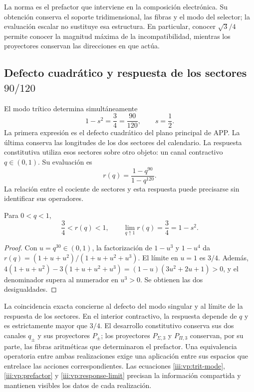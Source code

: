 La norma es el prefactor que interviene en la composición electrónica.
Su obtención conserva el soporte tridimensional, las fibras y el modo
del selector; la evaluación escalar no sustituye esa estructura. En
particular, conocer $\sqrt3/4$ permite conocer la magnitud máxima de
la incompatibilidad, mientras los proyectores conservan las direcciones
en que actúa.

\subsection{Defecto cuadrático y respuesta de los sectores \(90/120\)}

El modo trítico determina simultáneamente
\begin{equation}
 1-s^2=\frac34=\frac{90}{120},\qquad s=\frac12.
 \label{iii:vp:defect-ratio}
\end{equation}
La primera expresión es el defecto cuadrático del plano principal de APP.
La última conserva las longitudes de los dos sectores del calendario.
La respuesta constitutiva utiliza esos sectores sobre otro objeto: un
canal contractivo $q\in(0,1)$. Su evaluación es
\[
 r(q)=\frac{1-q^{90}}{1-q^{120}}.
\]
La relación entre el cociente de sectores y esta respuesta puede
precisarse sin identificar sus operadores.

\begin{proposition}
Para $0<q<1$,
\begin{equation}
 \frac34<r(q)<1,\qquad
 \lim_{q\uparrow1}r(q)=\frac34=1-s^2.
 \label{iii:vp:response-limit}
\end{equation}
\end{proposition}
\begin{proof}
Con $u=q^{30}\in(0,1)$, la factorización de $1-u^3$ y
$1-u^4$ da
$r(q)=(1+u+u^2)/(1+u+u^2+u^3)$. El límite en $u=1$ es
$3/4$. Además,
$4(1+u+u^2)-3(1+u+u^2+u^3)
=(1-u)(3u^2+2u+1)>0$, y el denominador supera al numerador
en $u^3>0$. Se obtienen las dos desigualdades.
\end{proof}

La coincidencia exacta concierne al defecto del modo singular y al límite
de la respuesta de los sectores. En el interior contractivo, la respuesta
depende de $q$ y es estrictamente mayor que $3/4$. El desarrollo
constitutivo conserva sus dos canales $q_\pm$ y sus proyectores
$P_\pm$; los proyectores $P_{\Sigma,3}$ y $P_{\Pi,3}$ conservan,
por su parte, las fibras aritméticas que determinaron el prefactor.
Una equivalencia operatoria entre ambas realizaciones exige una aplicación
entre sus espacios que entrelace las acciones correspondientes.
Las ecuaciones \eqref{iii:vp:trit-mode}, \eqref{iii:vp:prefactor} y
\eqref{iii:vp:response-limit} precisan la información compartida y
mantienen visibles los datos de cada realización.
